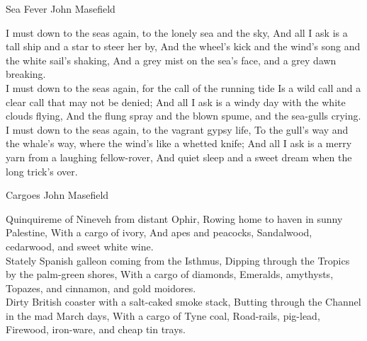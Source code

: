 \begin{poem}
{Sea Fever}
{John Masefield}

I must down to the seas again, to the lonely sea and the sky, 
And all I ask is a tall ship and a star to steer her by, 
And the wheel's kick and the wind's song and the white sail's shaking, 
And a grey mist on the sea's face, and a grey dawn breaking. \\

I must down to the seas again, for the call of the running tide 
Is a wild call and a clear call that may not be denied; 
And all I ask is a windy day with the white clouds flying, 
And the flung spray and the blown spume, and the sea-gulls crying.\\ 

I must down to the seas again, to the vagrant gypsy life, 
To the gull's way and the whale's way, where the wind's like a whetted knife; 
And all I ask is a merry yarn from a laughing fellow-rover, 
And quiet sleep and a sweet dream when the long trick's over. \\
\end{poem}

\begin{poem}
{Cargoes}
{John Masefield}

Quinquireme of Nineveh from distant Ophir, 
Rowing home to haven in sunny Palestine, 
With a cargo of ivory, 
And apes and peacocks, 
Sandalwood, cedarwood, and sweet white wine. \\

                           
Stately Spanish galleon coming from the Isthmus, 
Dipping through the Tropics by the palm-green shores, 
With a cargo of diamonds, 
Emeralds, amythysts, 
Topazes, and cinnamon, and gold moidores. \\
                           
Dirty British coaster with a salt-caked smoke stack, 
Butting through the Channel in the mad March days, 
With a cargo of Tyne coal, 
Road-rails, pig-lead, 
Firewood, iron-ware, and cheap tin trays. \\
\end{poem}


